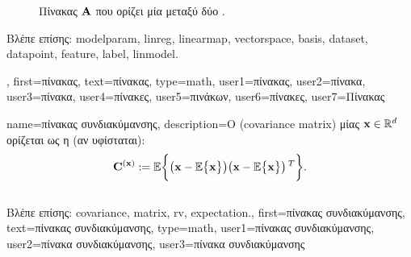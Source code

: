 {{\begin{figure}[H]
\begin{center}
\begin{tikzpicture}[x=2cm]
		\end{tikzpicture}
		\end{center}
		{
		\caption{\foreignlanguage{greek}{Πίνακας ${\bf A}$ που ορίζει μία}  \foreignlanguage{greek}{μεταξύ 
			δύο} . \label{fig_matrix_dict}} }
		\end{figure}
		\foreignlanguage{greek}{Βλέπε επίσης:} \gls{modelparam}, \gls{linreg}, \gls{linearmap}, \gls{vectorspace}, \gls{basis}, \gls{dataset}, 
		\gls{datapoint}, \gls{feature}, \gls{label}, \gls{linmodel}. },
	first={\foreignlanguage{greek}{πίνακας}},
	text={\foreignlanguage{greek}{πίνακας}},
	type=math,
	user1={\foreignlanguage{greek}{πίνακας}}, %
	user2={\foreignlanguage{greek}{πίνακα}}, %
	user3={\foreignlanguage{greek}{πίνακα}}, %
	user4={\foreignlanguage{greek}{πίνακες}}, %
	user5={\foreignlanguage{greek}{πινάκων}}, %
	user6={\foreignlanguage{greek}{πίνακες}}, %
	user7={\foreignlanguage{greek}{Πίνακας}} %
}

{name={\foreignlanguage{greek}{πίνακας συνδιακύμανσης}}, 
	description={\foreignlanguage{greek}{Ο} 
		  (covariance matrix) \foreignlanguage{greek}{μίας} 
		 ${\bf x} \in \mathbb{R}^{d}$ \foreignlanguage{greek}{ορίζεται ως η} 
		 \foreignlanguage{greek}{(αν υφίσταται}):
		$$\mathbf{C}^{({\bf x})} := \mathbb{E} \bigg \{ \big( {\bf x} - \mathbb{E} \big\{ {\bf x} \big\} \big)  
		\big({\bf x} - \mathbb{E} \big\{ {\bf x} \big\} \big)\,^{T} \bigg\}.$$
		\\
		\foreignlanguage{greek}{Βλέπε επίσης:} \gls{covariance}, \gls{matrix}, \gls{rv}, \gls{expectation}.},
	first={\foreignlanguage{greek}{πίνακας συνδιακύμανσης}},
	text={\foreignlanguage{greek}{πίνακας συνδιακύμανσης}},
	type=math,
	user1={\foreignlanguage{greek}{πίνακας συνδιακύμανσης}}, %
  	user2={\foreignlanguage{greek}{πίνακα συνδιακύμανσης}}, %
	user3={\foreignlanguage{greek}{πίνακα συνδιακύμανσης}} %
}

